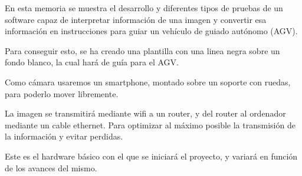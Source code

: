En esta memoria se muestra el desarrollo y diferentes tipos de pruebas de un software capaz de interpretar información de una imagen y convertir esa información en instrucciones para guiar un vehículo de guiado autónomo (AGV).

Para conseguir esto, se ha creado una plantilla con una linea negra sobre un fondo blanco, la cual hará de guía para el AGV. 

Como cámara usaremos un smartphone, montado sobre un soporte con ruedas, para poderlo mover libremente. 

La imagen se transmitirá mediante wifi a un router, y del router al ordenador mediante un cable ethernet. Para optimizar al máximo posible la transmisión de la información y evitar perdidas.

Este es el hardware básico con el que se iniciará el proyecto, y variará en función de los avances del mismo.
